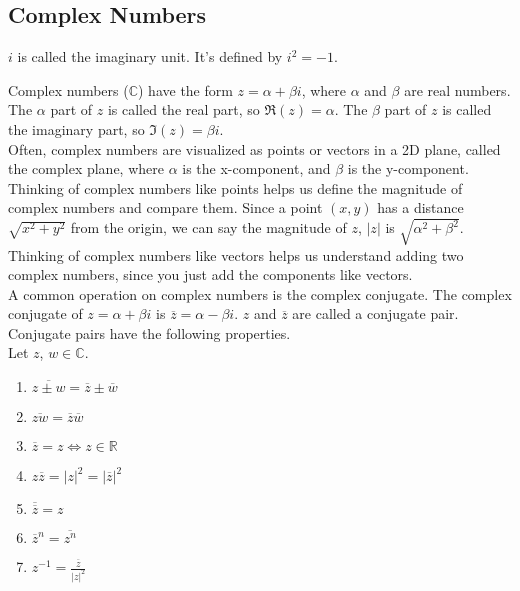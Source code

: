 \subsection{Complex Numbers}
\begin{definition}
	$i$ is called the imaginary unit. It's defined by $i^2 = -1$.
\end{definition}


\noindent
Complex numbers ($\mathbb{C}$) have the form $z = \alpha + \beta i$, where $\alpha$ and $\beta$ are real numbers. The $\alpha$ part of $z$ is called the real part, so $\Re(z) = \alpha$. The $\beta$ part of $z$ is called the imaginary part, so $\Im(z) = \beta i$.\\

\noindent
Often, complex numbers are visualized as points or vectors in a 2D plane, called the complex plane, where $\alpha$ is the x-component, and $\beta$ is the y-component. Thinking of complex numbers like points helps us define the magnitude of complex numbers and compare them. Since a point $(x,y)$ has a distance $\sqrt{x^2+y^2}$ from the origin, we can say the magnitude of $z$, $\lvert z \rvert$ is $\sqrt{\alpha^2 + \beta^2}$. Thinking of complex numbers like vectors helps us understand adding two complex numbers, since you just add the components like vectors.\\

\noindent
A common operation on complex numbers is the complex conjugate. The complex conjugate of $z = \alpha + \beta i$ is $\overline{z} = \alpha - \beta i$. $z$ and $\overline{z}$ are called a conjugate pair.\\

\noindent
Conjugate pairs have the following properties.
\\Let $z$, $w \in \mathbb{C}$.
\begin{enumerate}[label=]
	\item $\overline{z \pm w} = \overline{z} \pm \overline{w}$
	\item $\overline{zw}=\overline{z}\overline{w}$
	\item $\overline{z}=z \Leftrightarrow z \in \mathbb{R}$
	\item $z\overline{z} = \lvert z \rvert^2 = \lvert \overline{z} \rvert^2$
	\item $\overline{\overline{z}} = z$
	\item $\overline{z}^n = \overline{z^n}$
	\item $z^{-1} = \frac{\overline{z}}{\lvert z \rvert^2}$
\end{enumerate}